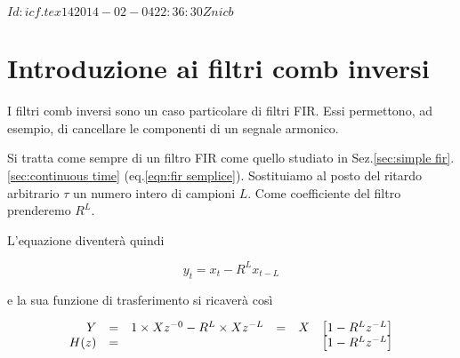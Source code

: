 %
%
%
\svnInfo $Id: icf.tex 14 2014-02-04 22:36:30Z nicb $

\section{Introduzione ai filtri comb inversi\label{sec:icf introduction}}

I filtri comb inversi sono un caso particolare di filtri FIR. Essi permettono,
ad esempio, di cancellare le componenti di un segnale armonico.

Si tratta come sempre di un filtro FIR come quello studiato in
Sez.\ref{sec:simple fir}.\vref{sec:continuous time}  (eq.\ref{eqn:fir
semplice}). Sostituiamo al posto del ritardo arbitrario $\tau$ un numero
intero di campioni $L$. Come coefficiente del filtro prenderemo $R^{L}$.

L'equazione diventer\`a quindi

\begin{equation}\label{eqn:icf 1}
		y_t = x_t - R^{L} x_{t - L}
\end{equation}

e la sua funzione di trasferimento si ricaver\`a cos\`i

\begin{equation}\label{eqn: icf 1 tf}
  \begin{array}{r c l c c l}
	Y & = & 1 \times X z^{-0} - R^{L} \times X z^{-L} & = & X & \left [ 1 - R^{L} z^{-L} \right ]\\ 
	H ( z ) & = &                                     &   &   & \left [ 1 - R^{L} z^{-L} \right ]\\
	\end{array}
\end{equation}

